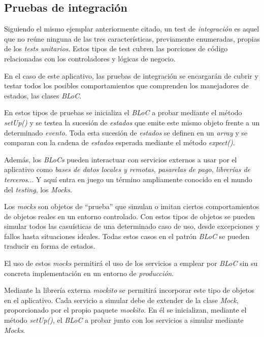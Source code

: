  \subsection{Pruebas de integración}
 Siguiendo el mismo ejemplar anteriormente citado, un test de \textit{integración} es aquel que no reúne ninguna
 de las tres características, previamente enumeradas, propias de los \textit{tests unitarios}.
 Estos tipos de test cubren las porciones de código relacionadas con los controladores y
 lógicas de negocio.

 En el caso de este aplicativo, las pruebas de integración se encargarán de cubrir y testar todos los posibles comportamientos
 que comprenden los manejadores de estados, las clases \textit{BLoC}.

 En estos tipos de pruebas se inicializa el \textit{BLoC} a probar mediante
 el método \textit{setUp()} y se testea la sucesión de \textit{estados} que emite este mismo
 objeto frente a un determinado \textit{evento}. Toda esta sucesión de \textit{estados} se definen en un \textit{array}
 y se comparan con la cadena de \textit{estados} esperada mediante el método \textit{expect()}.

 Además, los \textit{BLoCs} pueden interactuar con servicios externos a usar por el aplicativo como \textit{bases de datos locales y remotas},
 \textit{pasarelas de pago}, \textit{librerías de terceros}... Y aquí entra en juego un término ampliamente conocido en el mundo del  \textit{testing},
 los \textit{Mocks}.

 Los \textit{mocks} son objetos de ``prueba'' que simulan o imitan ciertos comportamientos
 de objetos reales en un entorno controlado. Con estos tipos de objetos se pueden simular
 todos las casuísticas de una determinado caso de uso, desde excepciones y fallos hasta situaciones
 ideales.
 Todas estos casos en el patrón \textit{BLoC} se pueden traducir en forma de estados.

 El uso de estos \textit{mocks} permitirá el uso de los servicios a emplear por \textit{BLoC} sin
 su concreta implementación en un entorno de \textit{producción}.
 
 Mediante la librería externa \textit{mockito} se permitirá incorporar este tipo de objetos
 en el aplicativo. Cada servicio a simular debe de
 extender de la clase \textit{Mock}, proporcionado por el propio paquete \textit{mockito}.
 En él se inicializan, mediante el método \textit{setUp()}, el \textit{BLoC} a probar junto con
 los servicios a simular mediante \textit{Mocks}.

